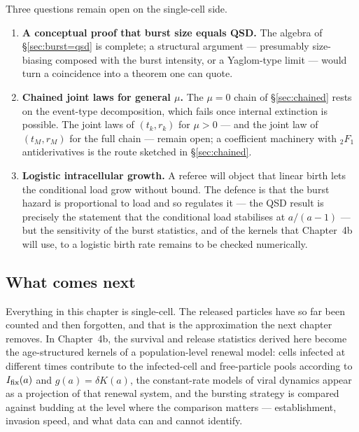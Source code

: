 Three questions remain open on the single-cell side.

\begin{enumerate}
\item \textbf{A conceptual proof that burst size equals QSD.} The algebra
of \S\ref{sec:burst=qsd} is complete; a structural argument --- presumably
size-biasing composed with the burst intensity, or a Yaglom-type limit
\cite{yaglom1947certain} --- would turn a coincidence into a theorem one
can quote.
\item \textbf{Chained joint laws for general $\mu$.} The
$\mu=0$ chain of \S\ref{sec:chained} rests on the event-type decomposition,
which fails once internal extinction is possible. The joint laws of
$(t_k,r_k)$ for $\mu>0$ --- and the joint law of $(t_M,r_M)$ for the full
chain --- remain open; a coefficient machinery with ${}_2F_1$
antiderivatives is the route sketched in \S\ref{sec:chained}.
\item \textbf{Logistic intracellular growth.} A referee will object that
linear birth lets the conditional load grow without bound. The defence is
that the burst hazard is proportional to load and so regulates it --- the
QSD result is precisely the statement that the conditional load stabilises
at $a/(a-1)$ --- but the sensitivity of the burst statistics, and of the
kernels that Chapter~4b will use, to a logistic birth rate remains to be
checked numerically.
\end{enumerate}

\subsection*{What comes next}

Everything in this chapter is single-cell. The released particles have so
far been counted and then forgotten, and that is the approximation the next
chapter removes. In Chapter~4b, the survival and release statistics derived
here become the age-structured kernels of a population-level renewal model:
cells infected at different times contribute to the infected-cell and
free-particle pools according to $I_{\mathrm{fix}}(a)$ and $g(a)=\delta K(a)$, the
constant-rate models of viral dynamics appear as a projection of that
renewal system, and the bursting strategy is compared against budding at the
level where the comparison matters --- establishment, invasion speed, and
what data can and cannot identify.
